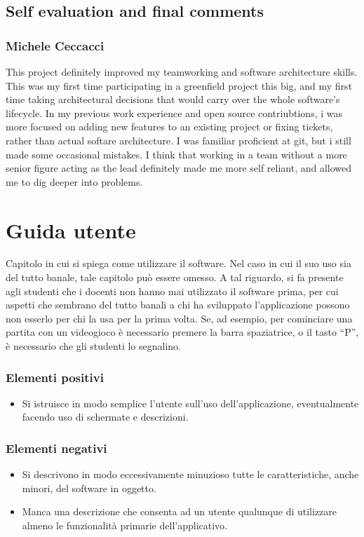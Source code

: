 \documentclass[a4paper,12pt]{report}
\begin{document}
\section{Self evaluation and final comments}

\subsection{Michele Ceccacci}
This project definitely improved my teamworking and software architecture skills. 
This was my first time participating in a greenfield project this big, and my first time 
taking architectural decisions that would carry over the whole software's lifecycle. 
In my previous work experience and open source contriubtions, i was more focused on  adding new features 
to an existing project or fixing tickets, rather than actual softare architecture. 
I was familiar proficient at git, but i still made some occasional mistakes.
I think that working in a team without a more senior figure acting as the  lead definitely 
made me more  self reliant, and allowed me to dig deeper into problems.

\appendix
\chapter{Guida utente}

Capitolo in cui si spiega come utilizzare il software. Nel caso in cui il suo uso sia del tutto
banale, tale capitolo può essere omesso.
%
A tal riguardo, si fa presente agli studenti che i docenti non hanno mai utilizzato il software
prima, per cui aspetti che sembrano del tutto banali a chi ha sviluppato l'applicazione possono non
esserlo per chi la usa per la prima volta.
%
Se, ad esempio, per cominciare una partita con un videogioco è necessario premere la barra
spaziatrice, o il tasto ``P'', è necessario che gli studenti lo segnalino.

\subsection*{Elementi positivi}

\begin{itemize}
 \item Si istruisce in modo semplice l'utente sull'uso dell'applicazione, eventualmente facendo uso di schermate e descrizioni.
\end{itemize}

\subsection*{Elementi negativi}
\begin{itemize}
 \item Si descrivono in modo eccessivamente minuzioso tutte le caratteristiche, anche minori, del software in oggetto.
 \item Manca una descrizione che consenta ad un utente qualunque di utilizzare almeno le funzionalità primarie dell'applicativo.
\end{itemize}
\end{document}
